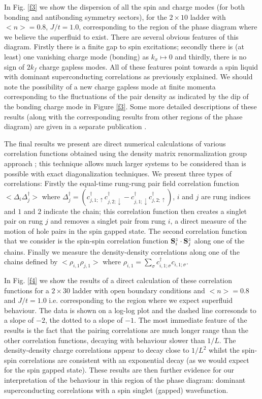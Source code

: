 {In Fig. \ref{f3} we show the dispersion
of all the spin and charge modes (for both
bonding and antibonding symmetry sectors),
 for the $2\times 10$ ladder with
 $\big < n\big >=0.8$, $J/t=1.0$, corresponding to the region of the phase
diagram
where we believe the superfluid to exist.
There are several obvious features of this diagram. Firstly there is a finite
gap to
spin excitations; secondly there is (at least) one vanishing charge mode
(bonding)
as $k_x$$\mapsto$0 and thirdly, there is no sign of $2k_f$  charge gapless
modes.
All of these features point towards a spin liquid with dominant superconducting
correlations  as previously  explained.
We should note the possibility of a  new charge gapless mode at finite momenta
corresponding to the fluctuations of the pair density as indicated by the dip
of the bonding charge mode in Figure \ref{f3}.
Some more detailed descriptions of these results (along with the corresponding
results
from other regions of the phase diagram) are given in a separate publication
\cite{DP}.

\bigskip

The final results we present are direct  numerical calculations of various
correlation functions obtained  using the
density matrix renormalization group approach \cite{rng}; this technique
 allows much larger systems to be considered than
is possible with exact diagonalization techniques.
We present three types of correlations: Firstly the equal-time rung-rung pair
field
correlation function $\big < \Delta_{i} \Delta_j^\dagger\big >$ where
$\Delta_j^\dagger=(c_{j,1;\uparrow}^\dagger c_{j,2;\downarrow}^\dagger -
c_{j,1;\downarrow}^\dagger c_{j,2;\uparrow}^\dagger)$,
$i$ and $j$ are rung indices and
$1$ and $2$ indicate the chain;  this correlation function then
creates a singlet pair on rung $j$ and removes a singlet pair from rung $i$, a
direct
measure of the motion of hole pairs in the spin gapped state.
The second correlation function that we consider is
the spin-spin correlation function ${\bf S}^z_i\cdot {\bf S}^z_j$ along
one of the chains.
Finally we measure the density-density correlations along one of the chains
defined
by $\big < \rho_{i,1}\rho_{j,1}\big >$
 where $\rho_{i,1}=\sum_{\sigma}c_{i,1;\sigma}^\dagger c_{i,1;\sigma}$.

In Fig. \ref{f4}  we show the results of a
direct calculation of these  correlation functions for a
$2\times 30$ ladder with open boundary conditions and
$\big <n\big >=0.8$ and $J/t=1.0$ i.e.  corresponding to the
region where we expect superfluid behaviour.
The data is shown on a log-log plot and the dashed line
corresonds to a slope of $-2$, the
dotted to a slope of $-1$.
The most immediate feature of the results is the fact
that the pairing correlations are
much longer range than the other correlation functions,
decaying with behaviour slower than
$1/L$. The density-density charge correlations appear to decay close to $1/L^2$
whilst
the spin-spin correlations are consistent with an exponential decay (as we
would expect for the spin gapped state).
These results are then further evidence for our
interpretation of the behaviour in this
region of the phase diagram:
dominant superconducting correlations with a spin singlet (gapped)
wavefunction.


}
